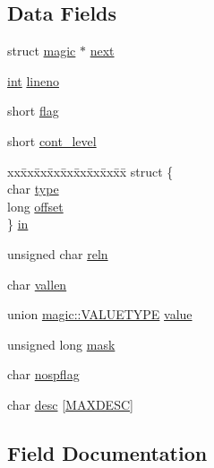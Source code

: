 \subsection*{Data Fields}
\begin{DoxyCompactItemize}
\item 
struct \hyperlink{structmagic}{magic} $\ast$ \hyperlink{structmagic_a2a2d228de6dcbf18ba6e34d0ce31f648}{next}
\item 
\hyperlink{pcre_8txt_a42dfa4ff673c82d8efe7144098fbc198}{int} \hyperlink{structmagic_ad64fbbb1ee2d17b86fa19c396095a8f8}{lineno}
\item 
short \hyperlink{structmagic_a5ca915651c35411f2484212850d024f5}{flag}
\item 
short \hyperlink{structmagic_a62ff662d46619703236cb606ea2de7d8}{cont\+\_\+level}
\item 
\begin{tabbing}
xx\=xx\=xx\=xx\=xx\=xx\=xx\=xx\=xx\=\kill
struct \{\\
\>char \hyperlink{structmagic_a27701704f5e4a599726323dbaa3873f3}{type}\\
\>long \hyperlink{structmagic_a5a6012e6fb599ae4f1a55eec3efa0322}{offset}\\
\} \hyperlink{structmagic_af6a4d14907f692d6c236eefc65a7fc73}{in}\\

\end{tabbing}\item 
unsigned char \hyperlink{structmagic_a304eedca29d25e6f86c659568035e6a9}{reln}
\item 
char \hyperlink{structmagic_a77a18392ab709a58a7b4c0cdffcf1711}{vallen}
\item 
union \hyperlink{unionmagic_1_1VALUETYPE}{magic\+::\+V\+A\+L\+U\+E\+T\+Y\+PE} \hyperlink{structmagic_a22209e0ed0303f04488686dee72c4ddf}{value}
\item 
unsigned long \hyperlink{structmagic_a7e0420750b776d27259139cf617b48e2}{mask}
\item 
char \hyperlink{structmagic_aa6f7200b3376d86fd97f5d821a6a65c0}{nospflag}
\item 
char \hyperlink{structmagic_afa73f413538c39032247559fbdfd160b}{desc} \mbox{[}\hyperlink{mod__mime__magic_8c_a282ab243d8a050b09c3fb21e4eebb54d}{M\+A\+X\+D\+E\+SC}\mbox{]}
\end{DoxyCompactItemize}


\subsection{Field Documentation}
